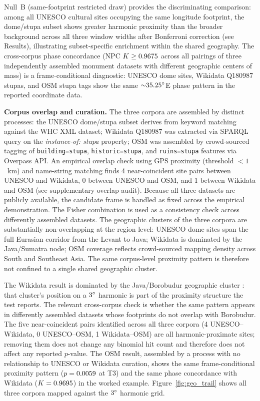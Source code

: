 \documentclass[12pt,a4paper]{article}
\newcommand{\degr}{\ifmmode^\circ\else\textdegree{}\fi}
\begin{document}
Null~B (same-footprint restricted draw) provides the
discriminating comparison: among all UNESCO cultural sites
occupying the same longitude footprint, the dome/stupa subset shows
greater harmonic proximity than the broader background across all three
window widths after Bonferroni correction (see Results), illustrating
subset-specific enrichment within the shared geography. The cross-corpus
phase concordance (NPC $K \geq 0.9675{}$ across all pairings of
three independently assembled monument datasets with different
geographic centers of mass) is a frame-conditional diagnostic:
UNESCO dome sites, Wikidata Q180987 stupas, and OSM stupa tags show
the same ${\sim}35.25\degr$E phase pattern in the reported coordinate
data.

\textbf{Corpus overlap and curation.}
The three corpora are assembled by distinct processes: the UNESCO
dome/stupa subset derives from keyword matching against the WHC XML
dataset; Wikidata Q180987 was extracted via SPARQL query on the
\textit{instance-of: stupa} property; OSM was assembled by
crowd-sourced tagging of \texttt{building=stupa},
\texttt{historic=stupa}, and \texttt{ruins=stupa} features via
Overpass API. An empirical overlap check using GPS proximity
(threshold $< 1$~km) and name-string matching finds 4 near-coincident
site pairs between UNESCO and Wikidata, 0 between UNESCO and OSM, and
1 between Wikidata and OSM (see supplementary overlap audit). Because
all three datasets are publicly available, the candidate frame is
handled as fixed across the empirical demonstration. The Fisher
combination is used as a consistency check across differently assembled
datasets. The geographic clusters of the three corpora are
substantially non-overlapping at the region
level: UNESCO dome sites span the full Eurasian corridor from the
Levant to Java; Wikidata is dominated by the Java/Sumatra node; OSM
coverage reflects crowd-sourced mapping density across South and
Southeast Asia. The same corpus-level proximity pattern is therefore
not confined to a single shared geographic cluster.

The Wikidata result is dominated by the Java/Borobudur geographic cluster
\citep{miksic1990borobudur}: that cluster's position on a $3\degr$
harmonic is part of the proximity structure the test reports.
The relevant cross-corpus check is whether the same pattern appears in
differently assembled datasets whose footprints do not overlap with Borobudur.
The five near-coincident pairs identified across all three corpora (4 UNESCO–Wikidata,
0 UNESCO–OSM, 1 Wikidata–OSM) are all harmonic-proximate sites; removing them
does not change any binomial hit count and therefore does not affect any reported
$p$-value. The OSM result, assembled by a process with no relationship to UNESCO
or Wikidata curation, shows the same frame-conditional proximity pattern
($p = 0.0059{}$ at T3) and the same phase concordance with
Wikidata ($K = 0.9695{}$) in the worked example.
Figure~\ref{fig:geo_trail}
shows all three corpora mapped against the $3\degr$ harmonic grid.
\end{document}

